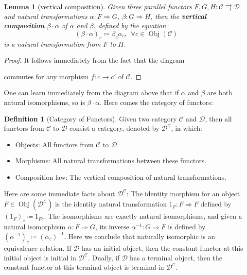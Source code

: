 \documentclass{article}
\newtheorem{lemma}[theorem]{Lemma}
\theoremstyle{definition}
\newtheorem{definition}{Definition}[section]
\theoremstyle{definition}
\theoremstyle{remark}
\DeclareMathOperator{\Obj}{Obj}
\begin{document}
	\begin{lemma}[vertical composition]
	Given three parallel functors $F,G,H:\mathcal{C}\rightrightarrows \mathcal{D}$ and natural transformations $\alpha:F\Rightarrow G$, $\beta:G\Rightarrow H$, then the \textbf{vertical composition} $\beta\cdot\alpha$ of $\alpha$ and $\beta$, defined by the equation
	\[(\beta\cdot\alpha)_c\coloneqq \beta_c\alpha_c,\ \ \forall c\in\Obj(\mathcal{C})\]
	is a natural transformation from $F$ to $H$. 
	\end{lemma}
	\begin{proof}
	It follows immediately from the fact that the diagram
		\begin{center}
		\end{center}
		commutes for any morphism $f:c\to c'$ of $\mathcal{C}$.
	\end{proof}
	One can learn immediately from the diagram above that if $\alpha$ and $\beta$ are both natural isomorphisms, so is $\beta\cdot \alpha$. Here comes the category of functors:
	\begin{definition}[Category of Functors]
	Given two category $\mathcal{C}$ and $\mathcal{D}$, then all functors from $\mathcal{C}$ to $\mathcal{D}$ consist a category, denoted by $\mathcal{D}^\mathcal{C}$, in which:
		\begin{itemize}
			\item Objects: All functors 	from $\mathcal{C}$ to $\mathcal{D}$.
			\item Morphisms: All natural transformations between these functors.
			\item Composition law: The vertical composition of natural transformations.
		\end{itemize}
	\end{definition}
	Here are some immediate facts about $\mathcal{D}^\mathcal{C}$: The identity morphism for an object $F\in\Obj(\mathcal{D}^\mathcal{C})$ is the identity natural transformation $1_F:F\Rightarrow F$  defined by $(1_F)_c\coloneqq 1_{Fc}$. The isomorphisms are exactly natural isomorphisms, and given a natural isomorphism $\alpha:F\Rightarrow G$, its inverse $\alpha^{-1}:G\Rightarrow F$ is defined by $(\alpha^{-1})_c\coloneqq (\alpha_c)^{-1}$. Here we conclude that naturally isomorphic is an equivalence relation. If $\mathcal{D}$ has an initial object, then the constant functor at this initial object is initial in $\mathcal{D}^\mathcal{C}$. Dually, if $\mathcal{D}$ has a terminal object, then the constant functor at this terminal object is terminal in $\mathcal{D}^\mathcal{C}$.
\end{document}
